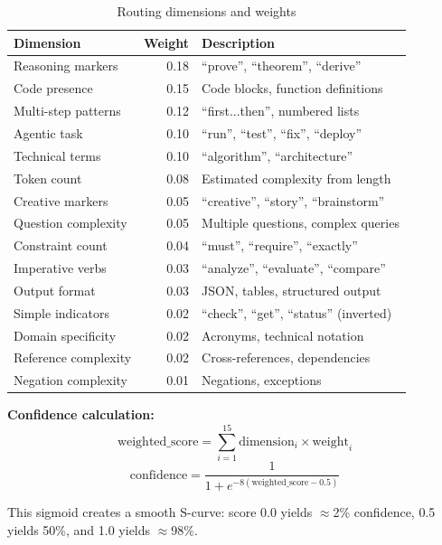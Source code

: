 \documentclass[conference]{IEEEtran}
\begin{document}
\begin{table}[h]
\centering
\caption{Routing dimensions and weights}
\label{tab:dimensions}
\footnotesize
\begin{tabular}{lrl}
\toprule
\textbf{Dimension} & \textbf{Weight} & \textbf{Description} \\
\midrule
Reasoning markers & 0.18 & ``prove'', ``theorem'', ``derive'' \\
Code presence & 0.15 & Code blocks, function definitions \\
Multi-step patterns & 0.12 & ``first...then'', numbered lists \\
Agentic task & 0.10 & ``run'', ``test'', ``fix'', ``deploy'' \\
Technical terms & 0.10 & ``algorithm'', ``architecture'' \\
Token count & 0.08 & Estimated complexity from length \\
Creative markers & 0.05 & ``creative'', ``story'', ``brainstorm'' \\
Question complexity & 0.05 & Multiple questions, complex queries \\
Constraint count & 0.04 & ``must'', ``require'', ``exactly'' \\
Imperative verbs & 0.03 & ``analyze'', ``evaluate'', ``compare'' \\
Output format & 0.03 & JSON, tables, structured output \\
Simple indicators & 0.02 & ``check'', ``get'', ``status'' (inverted) \\
Domain specificity & 0.02 & Acronyms, technical notation \\
Reference complexity & 0.02 & Cross-references, dependencies \\
Negation complexity & 0.01 & Negations, exceptions \\
\bottomrule
\end{tabular}
\end{table}

\textbf{Confidence calculation:}
\begin{equation}
\text{weighted\_score} = \sum_{i=1}^{15} \text{dimension}_i \times \text{weight}_i
\end{equation}
\begin{equation}
\text{confidence} = \frac{1}{1 + e^{-8(\text{weighted\_score} - 0.5)}}
\end{equation}

This sigmoid creates a smooth S-curve: score 0.0 yields $\approx$2\% confidence, 0.5 yields 50\%, and 1.0 yields $\approx$98\%.
\end{document}
